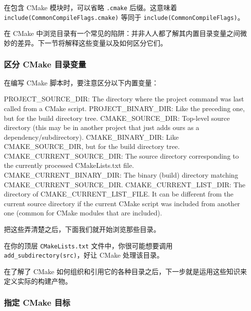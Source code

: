 
在包含 CMake 模块时，可以省略 \texttt{.cmake} 后缀。这意味着 \texttt{include(\allowbreak{}Common\allowbreak{}Compile\allowbreak{}Flags.\allowbreak{}cmake)\allowbreak{}} 等同于 \texttt{include(\allowbreak{}Common\allowbreak{}Compile\allowbreak{}Flags)\allowbreak{}}。

\label{idx:663}
在 CMake 中浏览目录有一个常见的陷阱：并非人人都了解其内置目录变量之间微妙的差异。下一节将解释这些变量以及如何区分它们。

\subsubsection{区分 CMake 目录变量}

\label{idx:664}
在编写 CMake 脚本时，要注意区分以下内置变量：

\begin{codebox}[yaml]
PROJECT_SOURCE_DIR: The directory where the project command was last called from a CMake script.
PROJECT_BINARY_DIR: Like the preceding one, but for the build directory tree.
CMAKE_SOURCE_DIR: Top-level source directory (this may be in another project that just adds ours as a dependency/subdirectory).
CMAKE_BINARY_DIR: Like CMAKE_SOURCE_DIR, but for the build directory tree.
CMAKE_CURRENT_SOURCE_DIR: The source directory corresponding to the currently processed CMakeLists.txt file.
CMAKE_CURRENT_BINARY_DIR: The binary (build) directory matching CMAKE_CURRENT_SOURCE_DIR.
CMAKE_CURRENT_LIST_DIR: The directory of CMAKE_CURRENT_LIST_FILE. It can be different from the current source directory if the current CMake script was included from another one (common for CMake modules that are included).
\end{codebox}

把这些弄清楚之后，下面我们就开始浏览那些目录。

在你的顶层 \texttt{CMake\allowbreak{}Lists.\allowbreak{}txt} 文件中，你很可能想要调用 \texttt{add\_\allowbreak{}subdirectory(\allowbreak{}src)\allowbreak{}}，好让 CMake 处理该目录。

在了解了 CMake 如何组织和引用它的各种目录之后，下一步就是运用这些知识来定义实际的构建产物。

\subsubsection{指定 CMake 目标}

